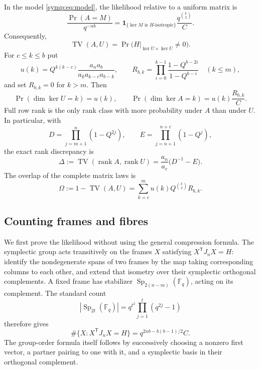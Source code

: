 \begin{theorem}
\label{symp:thm:finite}
In the model \eqref{symp:eq:model}, the likelihood relative to a uniform
matrix is
\begin{equation}
 \frac{\Pr(A=M)}{q^{-nb}}
 =\mathbf 1_{\{\ker M\text{ is }H\text{-isotropic}\}}
   \frac{q^{\binom{k}{2}}}{C}.
 \label{symp:eq:density}
\end{equation}
Consequently,
\begin{equation}
 \operatorname{TV}(A,U)
 =\Pr\bigl(H|_{\ker U\times\ker U}\ne0\bigr).
 \label{symp:eq:fulltv}
\end{equation}
For $c\le k\le b$ put
\begin{equation}
 u(k)=Q^{k(k-c)}\frac{a_na_b}{a_ka_{k-c}a_{b-k}},\qquad
 R_{b,k}=\prod_{i=0}^{k-1}
          \frac{1-Q^{b-2i}}{1-Q^{b-i}}\quad(k\le m),
 \label{symp:eq:rank-formulas}
\end{equation}
and set $R_{b,k}=0$ for $k>m$.  Then
\begin{equation}
 \Pr(\dim\ker U=k)=u(k),\qquad
 \Pr(\dim\ker A=k)=u(k)\frac{R_{b,k}}C.
 \label{symp:eq:rank-law}
\end{equation}
Full row rank is the only rank class with more probability under $A$ than
under $U$.  In particular, with
\[
 D=\prod_{j=m+1}^n(1-Q^{2j}),\qquad
 E=\prod_{j=n+1}^{n+c}(1-Q^j),
\]
the exact rank discrepancy is
\begin{equation}
 \Delta:=\operatorname{TV}(\operatorname{rank}A,\operatorname{rank}U)
 =\frac{a_n}{a_c}\bigl(D^{-1}-E\bigr).
 \label{symp:eq:rank-tv}
\end{equation}
The overlap of the complete matrix laws is
\begin{equation}
 \Omega:=1-\operatorname{TV}(A,U)
  =\sum_{k=c}^{m}u(k)Q^{\binom{k}{2}}R_{b,k}.
 \label{symp:eq:overlap}
\end{equation}
\end{theorem}

\subsection{Counting frames and fibres}

We first prove the likelihood without using the general compression formula.
The symplectic group acts transitively on the frames $X$ satisfying
$X^{\mathsf T}J_nX=H$: identify the nondegenerate spans of two frames by the
map taking corresponding columns to each other, and extend that isometry
over their symplectic orthogonal complements.  A fixed frame has stabilizer
$\operatorname{Sp}_{2(n-m)}(\mathbb F_q)$, acting on its complement.  The
standard count
\[
 |\operatorname{Sp}_{2t}(\mathbb F_q)|
   =q^{t^2}\prod_{j=1}^{t}(q^{2j}-1)
\]
therefore gives
\begin{equation}
 \#\{X:X^{\mathsf T}J_nX=H\}
 =q^{2nb-b(b-1)/2}C.
 \label{symp:eq:frame-count}
\end{equation}
The group-order formula itself follows by successively choosing a nonzero
first vector, a partner pairing to one with it, and a symplectic basis in
their orthogonal complement.

